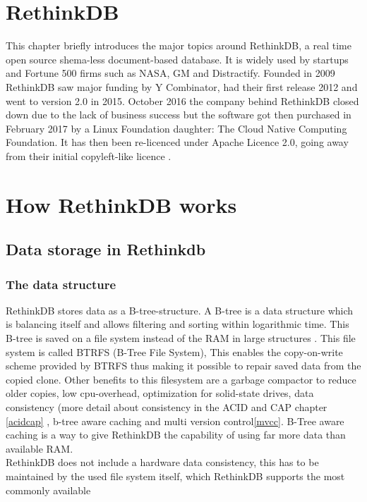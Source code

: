 \section{RethinkDB}

This chapter briefly introduces the major topics around RethinkDB, a real time open source shema-less document-based database. It is widely used by startups and Fortune 500 firms such as NASA, GM and Distractify. Founded in 2009 RethinkDB saw major funding by Y Combinator, had their first release 2012 and went to version 2.0 in 2015. October 2016 the company behind RethinkDB closed down due to the lack of business success but the software got then purchased in February 2017 by a Linux Foundation daughter: The Cloud Native Computing Foundation. It has then been re-licenced under Apache Licence 2.0, going away from their initial copyleft-like licence \cite{RethinkCNCF,techcrunchredb}.   

\section{How RethinkDB works}

\subsection{Data storage in Rethinkdb}

\subsubsection{The data structure}

RethinkDB stores data as a B-tree-structure. A B-tree is a data structure which is balancing itself and allows filtering and sorting within logarithmic time. This B-tree is saved on a file system instead of the RAM in large structures \cite{BTreeTechTarget}. This file system is called BTRFS (B-Tree File System),  This enables the copy-on-write scheme provided by BTRFS thus making it possible to repair saved data from the copied clone. Other benefits to this filesystem are a garbage compactor to reduce older copies, low cpu-overhead, optimization for solid-state drives, data consistency (more detail about consistency in the ACID and CAP chapter \ref{acidcap} , b-tree aware caching and multi version control\ref{mvcc}. B-Tree aware caching is a way to give RethinkDB the capability of using far more data than available RAM.\\
RethinkDB does not include a hardware data consistency, this has to be maintained by the used file system itself, which RethinkDB supports the most commonly available \cite{RethinkDataStorage}


